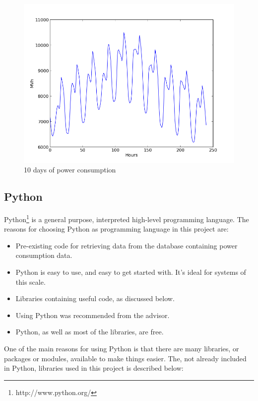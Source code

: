 \documentclass[12pt]{article}
\begin{document}
\begin{figure}[h]
\centering
\includegraphics[width = \textwidth]{10days}
\caption{10 days of power consumption}
\label{fig:10days}
\end{figure}




\subsection{Python}
\label{python}
Python\footnote{http://www.python.org/} is a general purpose, interpreted high-level programming language. The reasons for choosing Python as programming language in this project are:

\begin{itemize}
\item Pre-existing code for retrieving data from the database containing power consumption data. 
\item Python is easy to use, and easy to get started with. It's ideal for systems of this scale.
\item Libraries containing useful code, as discussed below.
\item Using Python was recommended from the advisor. 
\item Python, as well as most of the libraries, are free.
\end{itemize}

One of the main reasons for using Python is that there are many libraries, or packages or modules, available to make things easier. The, not already included in Python, libraries  used in this project is described below:
\end{document}
